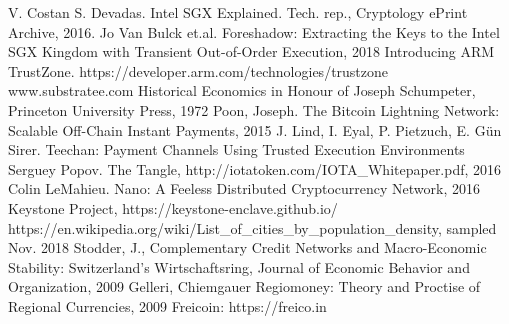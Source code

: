 \documentclass[conference]{IEEEtran}
\begin{document}
\begin{thebibliography}{00}
 V. Costan S. Devadas. Intel SGX Explained. Tech. rep., Cryptology ePrint
Archive, 2016.
 Jo Van Bulck et.al. Foreshadow: Extracting the Keys to the Intel SGX Kingdom with Transient Out-of-Order Execution, 2018
 Introducing ARM TrustZone. https://developer.arm.com/technologies/trustzone
 www.substratee.com
Historical Economics in Honour of Joseph Schumpeter,
Princeton University Press, 1972
Poon, Joseph. The Bitcoin Lightning Network: Scalable Off-Chain Instant Payments, 2015
 J. Lind, I. Eyal, P. Pietzuch, E. Gün Sirer. Teechan: Payment Channels Using Trusted Execution Environments
Serguey Popov. The Tangle, http://iotatoken.com/IOTA\_Whitepaper.pdf, 2016
Colin LeMahieu. Nano: A Feeless Distributed Cryptocurrency
Network, 2016
Keystone Project, https://keystone-enclave.github.io/
https://en.wikipedia.org/wiki/List\_of\_cities\_by\_population\_density, sampled Nov. 2018
Stodder, J., Complementary Credit Networks and Macro-Economic Stability: Switzerland’s Wirtschaftsring, Journal of Economic Behavior and Organization, 2009
Gelleri, Chiemgauer Regiomoney: Theory and Proctise of Regional Currencies, 2009
Freicoin: https://freico.in
\end{thebibliography}
\end{document}
